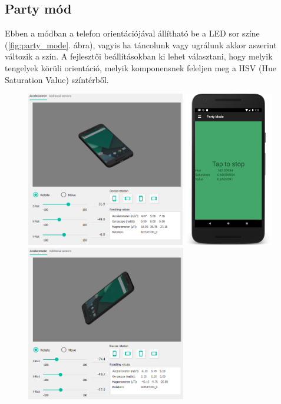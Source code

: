 \documentclass[../main.tex]{subfiles}
\begin{document}
        \subsection{Party mód}
            Ebben a módban a telefon orientációjával állítható be a LED sor színe (\ref{fig:party_mode}. ábra), vagyis ha táncolunk vagy ugrálunk akkor aszerint változik a szín. A fejlesztői beállításokban ki lehet választani, hogy 
            melyik tengelyek körüli orientáció, melyik komponensnek feleljen meg a HSV (Hue Saturation Value) színtérből.
            \begin{figure}[h!]
                \centering
                    \includegraphics[height=6.8cm]{android_res/screen_pictures/phone_orientation_01}
                    \includegraphics[height=6.8cm]{android_res/screen_pictures/phone_orientation_11}
                    \includegraphics[height=6.8cm]{android_res/screen_pictures/phone_orientation_02}

\end{figure}
\end{document}
